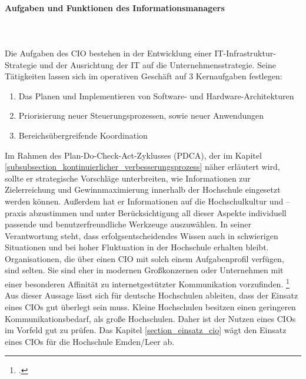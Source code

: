 \paragraph{Aufgaben und Funktionen des Informationsmanagers}\mbox{}\\\\
\label{aufgaben_funktionen_informationsmanager}
Die Aufgaben des CIO bestehen in der Entwicklung einer IT-Infrastruktur-Strategie und der Ausrichtung der IT auf die Unternehmensstrategie. Seine Tätigkeiten lassen sich im operativen Geschäft auf 3 Kernaufgaben festlegen: 
\begin{enumerate}
	\item Das Planen und Implementieren von Software- und Hardware-Architekturen 
	\item Priorisierung neuer Steuerungsprozessen, sowie neuer Anwendungen
	\item Bereichsübergreifende Koordination
\end{enumerate}

Im Rahmen des Plan-Do-Check-Act-Zyklusses (PDCA), der im Kapitel  \ref{subsubsection_kontinuierlicher_verbesserungsprozess} näher erläutert wird,  sollte er strategische Vorschläge unterbreiten, wie Informationen zur Zielerreichung und Gewinnmaximierung innerhalb der Hochschule eingesetzt werden können. Außerdem hat er Informationen auf die Hochschulkultur und –praxis  abzustimmen und unter Berücksichtigung all dieser Aspekte individuell passende und benutzerfreundliche Werkzeuge auszuwählen. In seiner Verantwortung steht, dass erfolgsentscheidendes Wissen auch in schwierigen Situationen und bei hoher Fluktuation in der Hochschule erhalten bleibt. Organisationen, die über einen CIO mit solch einem Aufgabenprofil verfügen, sind selten. Sie sind eher in modernen Großkonzernen oder Unternehmen mit einer besonderen Affinität zu internetgestützter Kommunikation vorzufinden. \footcite[Vgl.][404]{becker_gora_uhrig_2012}
Aus dieser Aussage lässt sich für deutsche Hochschulen ableiten, dass der Einsatz eines CIOs gut überlegt sein muss. Kleine Hochschulen besitzen einen geringeren Kommunikationsbedarf, als große Hochschulen. Daher ist der Nutzen eines CIOs im Vorfeld gut zu prüfen. Das Kapitel \ref{section_einsatz_cio} wägt den Einsatz eines CIOs für die Hochschule Emden/Leer ab.


